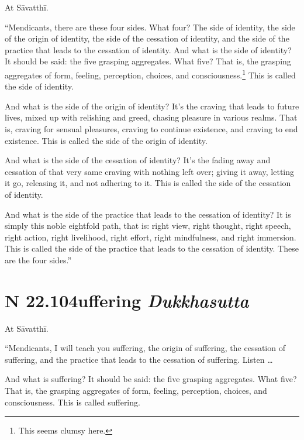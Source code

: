 \documentclass[12pt,openany]{book}%
\newcommand*{\suttatitleacronym}[1]{\smaller[2]{#1}\vspace*{.3em}}
\newcommand*{\suttatitletranslation}[1]{\linebreak{#1}}
\newcommand*{\suttatitleroot}[1]{\linebreak\smaller[2]\itshape{#1}}
\newcommand*{\tocacronym}[1]{\hspace*{-3.3em}{#1}\quad}
\newcommand*{\toctranslation}[1]{#1}
\newcommand*{\tocroot}[1]{(\textit{#1})}
\begin{document}
At \textsanskrit{Sāvatthī}. 

“Mendicants, there are these four sides. What four? The side of identity, the side of the origin of identity, the side of the cessation of identity, and the side of the practice that leads to the cessation of identity. And what is the side of identity? It should be said: the five grasping aggregates. What five? That is, the grasping aggregates of form, feeling, perception, choices, and consciousness.\footnote{This seems clumsy here. } This is called the side of identity. 

And what is the side of the origin of identity? It’s the craving that leads to future lives, mixed up with relishing and greed, chasing pleasure in various realms. That is, craving for sensual pleasures, craving to continue existence, and craving to end existence. This is called the side of the origin of identity. 

And what is the side of the cessation of identity? It’s the fading away and cessation of that very same craving with nothing left over; giving it away, letting it go, releasing it, and not adhering to it. This is called the side of the cessation of identity. 

And what is the side of the practice that leads to the cessation of identity? It is simply this noble eightfold path, that is: right view, right thought, right speech, right action, right livelihood, right effort, right mindfulness, and right immersion. This is called the side of the practice that leads to the cessation of identity. These are the four sides.” 

%
\section*{{\suttatitleacronym SN 22.104}{\suttatitletranslation Suffering }{\suttatitleroot Dukkhasutta}}
\addcontentsline{toc}{section}{\tocacronym{SN 22.104} \toctranslation{Suffering } \tocroot{Dukkhasutta}}

At \textsanskrit{Sāvatthī}. 

“Mendicants, I will teach you suffering, the origin of suffering, the cessation of suffering, and the practice that leads to the cessation of suffering. Listen … 

And what is suffering? It should be said: the five grasping aggregates. What five? That is, the grasping aggregates of form, feeling, perception, choices, and consciousness. This is called suffering. 
\end{document}

